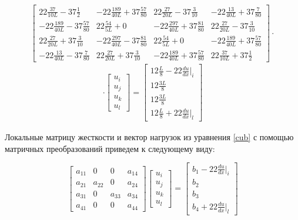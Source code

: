 $$
\begin{bmatrix}
		22\frac{37}{10L}  -37 \frac{1}{2}     &   -22 \frac{189}{40L}   +37 \frac{57}{80}     & 22\frac{27}{20L} -37 \frac{3}{10}       &   -22 \frac{13}{40L}   +37   \frac{7}{80}  \\
		  -22 \frac{189}{40L}  -37  \frac{57}{80}   & 22\frac{54}{5L}+0   &   -22 \frac{297}{40L} +37  \frac{81}{80}   & 22\frac{27}{20L}  -37 \frac{3}{10}     \\
		22\frac{27}{20L}  +37 \frac{3}{10}      &   -22 \frac{297}{40L} -37 \frac{81}{80}     & 22\frac{54}{5L}+0   &   -22 \frac{189}{40L}  +37 \frac{57}{80}     \\
	      -22 \frac{13}{40L}  -37 \frac{7}{80}     & 22\frac{27}{20L} +37  \frac{3}{10}   &   -22 \frac{189}{40L} +37  \frac{57}{80}   & 22\frac{37}{10L}  +37  \frac{1}{2}  
\end{bmatrix}
\cdot
$$
\begin{align}\label{cub}
\cdot
\begin{bmatrix}
	u_i \\
	u_j \\
	u_k\\
	u_l
\end{bmatrix}
=
\begin{bmatrix}
     12\frac{L}{8}    -22 \frac{du}{dx}|_i   \\
	 12\frac{3L}{8} \\
	 12\frac{3L}{8} \\
	 12\frac{L}{8}    +22 \frac{du}{dx}|_l 
\end{bmatrix}
\end{align}

Локальные матрицу жесткости и вектор нагрузок из уравнения \ref{cub} с помощью матричных преобразований приведем к следующему виду:

$$ \begin{bmatrix}
a_{11}     &  0  & 0  &  a_{14}\\
a_{21}     &  a_{22}  & 0  &  a_{24}\\
a_{31}     &  0  &  a_{33} &  a_{34}\\
a_{41}     &  0  & 0  &  a_{44}
\end{bmatrix}
\begin{bmatrix}
u_i \\
u_j \\
u_k\\
u_l
\end{bmatrix} =
\begin{bmatrix}
b_1   -22  \frac{du}{dx}|_i \\
b_2\\
b_3\\
b_4   +22  \frac{du}{dx}|_l
\end{bmatrix}$$

